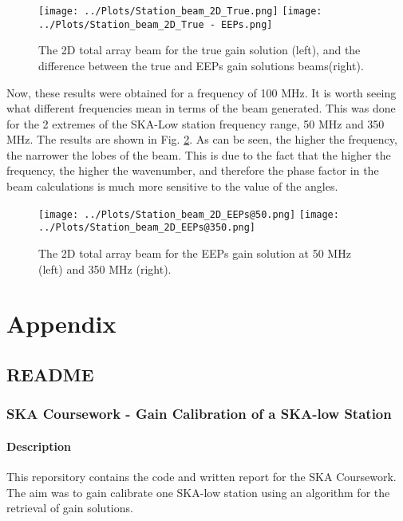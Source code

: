 \documentclass[12pt]{report} %
\begin{document}
\begin{figure}[h]
    \centering
    \texttt{[image: ../Plots/Station\_beam\_2D\_True.png]}
    \texttt{[image: ../Plots/Station\_beam\_2D\_True - EEPs.png]}
    \caption{The 2D total array beam for the true gain solution (left), and the difference between the true and EEPs gain solutions beams(right).}
    \label{fig:2D_beam_true_diff}
\end{figure}

Now, these results were obtained for a frequency of 100 MHz. It is worth seeing what different frequencies mean in terms of the beam generated. This was done for the 2 extremes of the SKA-Low station frequency range, 50 MHz and 350 MHz. The results are shown in Fig. \ref{fig:2D_beam_freqs}. As can be seen, the higher the frequency, the narrower the lobes of the beam. This is due to the fact that the higher the frequency, the higher the wavenumber, and therefore the phase factor in the beam calculations is much more sensitive to the value of the angles.

\begin{figure}[h]
    \centering
    \texttt{[image: ../Plots/Station\_beam\_2D\_EEPs@50.png]}
    \texttt{[image: ../Plots/Station\_beam\_2D\_EEPs@350.png]}
    \caption{The 2D total array beam for the EEPs gain solution at 50 MHz (left) and 350 MHz (right).}
    \label{fig:2D_beam_freqs}
\end{figure}


\chapter{Appendix}

\section{README}

\subsection{SKA Coursework - Gain Calibration of a SKA-low Station}

\subsubsection{Description}
This reporsitory contains the code and written report for the SKA Coursework. The aim was to gain calibrate one SKA-low station using an algorithm for the retrieval of gain solutions.
\end{document}
